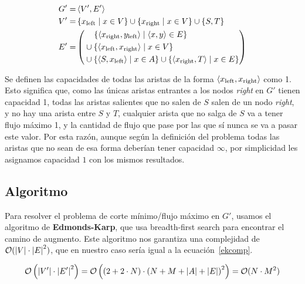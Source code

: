 \begin{align}
G' = &\left<V', E'\right> \\
V' = &\left\{ x_{\text{left}} \mid x \in V \right\} \cup \left\{ x_{\text{right}} \mid x \in V \right\} \cup \left\{ S, T \right\} \\
E' = &\left(
\begin{aligned}
&\;\;\;\, \left\{ \left< x_{\text{right}}, y_{\text{left}} \right> \mid \left< x, y \right> \in E \right\} \\
& \cup \left\{ \left< x_{\text{left}}, x_{\text{right}} \right> \mid x \in V \right\} \\
& \cup \left\{ \left< S, x_{\text{left}} \right> \mid x \in A \right\} \cup \left\{ \left< x_{\text{right}}, T \right> \mid x \in E \right\}
\end{aligned}
\right)
\end{align}

Se definen las capacidades de todas las aristas de la forma \(\left< x_{\text{left}}, x_{\text{right}} \right>\) como 1. Esto significa que, como las únicas aristas entrantes a los nodos \textit{right} en \(G'\) tienen capacidad 1, todas las aristas salientes que no salen de \(S\) salen de un nodo \textit{right}, y no hay una arista entre \(S\) y \(T\), cualquier arista que no salga de \(S\) va a tener flujo máximo 1, y la cantidad de flujo que pase por las que sí nunca se va a pasar este valor. Por esta razón, aunque según la definición del problema todas las aristas que no sean de esa forma deberían tener capacidad \(\infty\), por simplicidad les asignamos capacidad \(1\) con los mismos resultados.

\subsection{Algoritmo}

Para resolver el problema de corte mínimo/flujo máximo en \(G'\), usamos el algoritmo de \textbf{Edmonds-Karp}\cite{cormen}, que usa breadth-first search para encontrar el camino de augmento. Este algoritmo nos garantiza una complejidad de \(\mathcal{O}(|V| \cdot {|E|}^2)\)\cite[\textit{theorem~26.8}]{cormen}, que en nuestro caso sería igual a la ecuación~\ref{ekcomp}.

\begin{equation}
\mathcal{O}\left(\left|V'\right| \cdot {\left|E'\right|}^2\right) = \mathcal{O}\left(\left(2 + 2 \cdot N\right) \cdot {\left(N + M + \left|A\right| + \left|E\right|\right)}^2\right) = \mathcal{O}(N \cdot M^2)
\label{ekcomp}
\end{equation}

